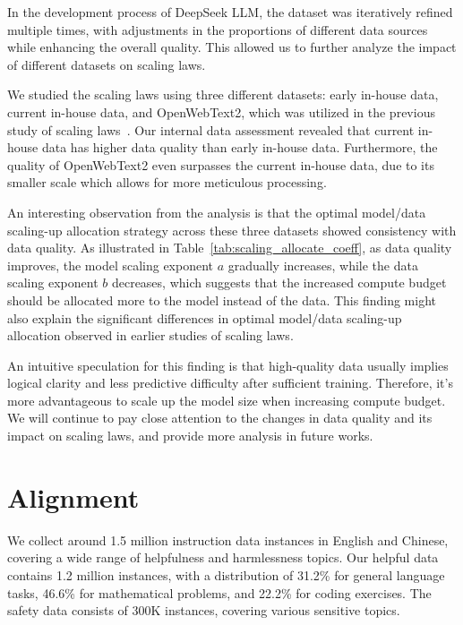 In the development process of DeepSeek LLM, the dataset was iteratively refined multiple times, with adjustments in the proportions of different data sources while enhancing the overall quality. This allowed us to further analyze the impact of different datasets on scaling laws.

We studied the scaling laws using three different datasets: early in-house data, current in-house data, and OpenWebText2, which was utilized in the previous study of scaling laws~\citep{scalinglaw}. Our internal data assessment revealed that current in-house data has higher data quality than early in-house data. Furthermore, the quality of OpenWebText2 even surpasses the current in-house data, due to its smaller scale which allows for more meticulous processing.

An interesting observation from the analysis is that the optimal model/data scaling-up allocation strategy across these three datasets showed consistency with data quality. As illustrated in Table~\ref{tab:scaling_allocate_coeff}, as data quality improves, the model scaling exponent $a$ gradually increases, while the data scaling exponent $b$ decreases, which suggests that the increased compute budget should be allocated more to the model instead of the data. This finding might also explain the significant differences in optimal model/data scaling-up allocation observed in earlier studies of scaling laws.

An intuitive speculation for this finding is that high-quality data usually implies logical clarity and less predictive difficulty after sufficient training. Therefore, it's more advantageous to scale up the model size when increasing compute budget. We will continue to pay close attention to the changes in data quality and its impact on scaling laws, and provide more analysis in future works.

\section{Alignment}
\label{sec:alignment}

We collect around 1.5 million instruction data instances in English and Chinese, covering a wide range of helpfulness and harmlessness topics.  Our helpful data contains 1.2 million instances,  with a distribution of 31.2\% for general language tasks, 46.6\% for mathematical problems, and 22.2\% for coding exercises. The safety data consists of 300K instances, covering various sensitive topics. 

